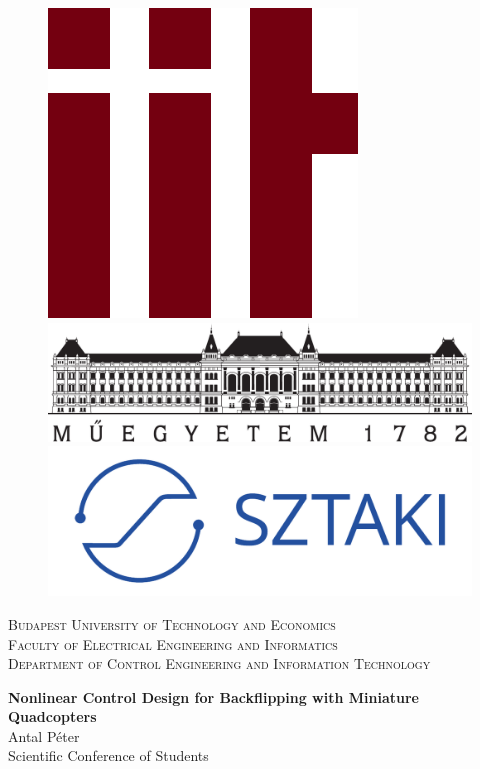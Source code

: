 \thispagestyle{empty}
\begin{figure}
\centering
\begin{minipage}{0.2\textwidth}
		\includegraphics[width=.5\linewidth]{Fig/logo.png}

\end{minipage}
\begin{minipage}{0.55\textwidth}
		\includegraphics[width=.9\linewidth]{Fig/bme_logo_nagy.pdf}
\end{minipage}
\begin{minipage}{0.2\textwidth}
		\includegraphics[width=\linewidth]{Fig/sztaki_logo_2019_uj_kek.pdf}
\end{minipage}		
\end{figure}
\begin{center}
{\textsc{Budapest University of Technology and Economics\\Faculty of Electrical Engineering and Informatics\\Department of Control Engineering and Information Technology}}


{\Large\textbf{Nonlinear Control Design for Backflipping with Miniature Quadcopters\\}}
{\Large{Antal Péter\\}}
{\large{Scientific Conference of Students\\}}
\end{center}
